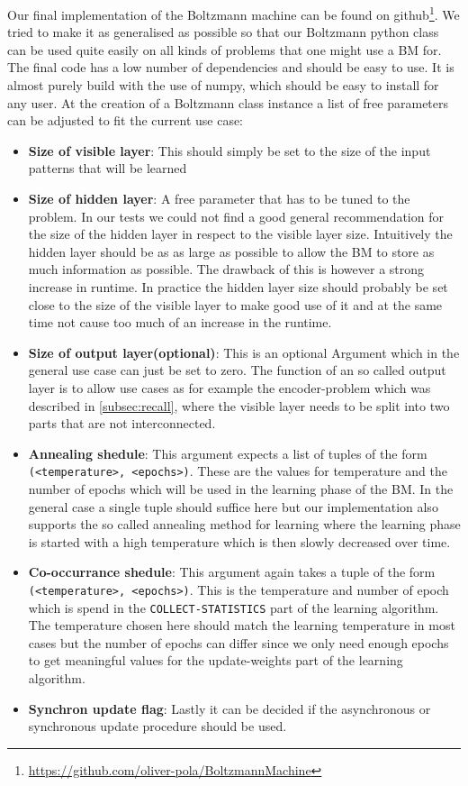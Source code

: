 \documentclass[12pt,twoside]{article}
\theoremstyle{plain}
\theoremstyle{definition}
\theoremstyle{remark}
\begin{document}
Our final implementation of the Boltzmann machine can be found on github\footnote{\url{https://github.com/oliver-pola/BoltzmannMachine}}. We tried to make it as generalised as possible
so that our Boltzmann python class can be used quite easily on all kinds of problems that one might use a BM for. The final code has a low number of dependencies and should be
easy to use. It is almost purely build with the use of numpy, which should be easy to install for any user.
At the creation of a Boltzmann class instance a list of free parameters can be adjusted to fit the current use case:
\begin{itemize}
    \item \textbf{Size of visible layer}: This should simply be set to the size of the input patterns that will be learned
    \item \textbf{Size of hidden layer}: A free parameter that
        has to be tuned to the problem. In our tests we could
        not find a good general recommendation for the size
        of the hidden layer in respect to the visible layer size.
        Intuitively the hidden layer should be as as large as possible to allow 
        the BM to store as much information as possible. The drawback of this is however
        a strong increase in runtime. In practice the hidden layer size should 
        probably be set close to the size of the visible layer to make good use of it and
        at the same time not cause too much of an increase in the runtime.

    \item \textbf{Size of output layer(optional)}: This is an optional
        Argument which in the general use case can just be set to zero.
        The function of an so called output layer is to allow use cases as
        for example the encoder-problem which was described in \cref{subsec:recall}, where
        the visible layer needs to be split into two parts that are not interconnected.
    \item \textbf{Annealing shedule}: This argument expects a list of tuples of the form
        \lstinline{(<temperature>, <epochs>)}. These are the values for temperature and the
        number of epochs which will be used in the learning phase of the BM.
        In the general case a single tuple should suffice here but our implementation also
        supports the so called annealing method for learning where the learning phase
        is started with a high temperature which is then slowly decreased over time.
    \item \textbf{Co-occurrance shedule}: This argument again takes a tuple of the form
        \lstinline{(<temperature>, <epochs>)}. This is the temperature and number of
        epoch which is spend in the \lstinline{COLLECT-STATISTICS} part of the
        learning algorithm. The temperature chosen here should match the learning
        temperature in most cases but the number of epochs can differ since we
        only need enough epochs to get meaningful values for the update-weights
        part of the learning algorithm.
    \item \textbf{Synchron update flag}: Lastly it can be decided if the asynchronous or
        synchronous update procedure should be used.
\end{itemize}
\end{document}
